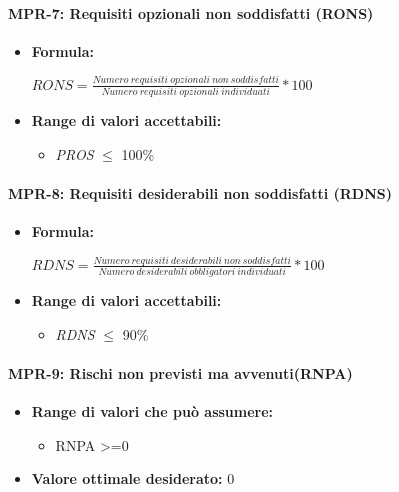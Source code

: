   
\paragraph{MPR-7: Requisiti opzionali non soddisfatti (RONS)}
  \begin{itemize}

    \item \textbf{Formula:}
    \begin{center}
        \(RONS=\frac{Numero\ requisiti\ opzionali\ non\ soddisfatti}{Numero\ requisiti\  opzionali\ individuati}*100\)
    \end{center}
    \item \textbf{Range di valori accettabili:}
    \begin{itemize}
        \item \textit{PROS} $\leq$ 100\%
    
    \end{itemize}
\end{itemize}


\paragraph{MPR-8: Requisiti desiderabili non soddisfatti (RDNS)}
\begin{itemize}
 
  \item \textbf{Formula:}
  \begin{center}
    \(RDNS=\frac{Numero\ requisiti\ desiderabili\ non\ soddisfatti}{Numero\ desiderabili\  obbligatori\ individuati}*100\)
  \end{center}
  \item \textbf{Range di valori accettabili:}
  \begin{itemize}
      \item \textit{RDNS} $\leq$ 90\%
  
  \end{itemize}
\end{itemize}




\paragraph{MPR-9: Rischi non previsti ma avvenuti(RNPA)}
\begin{itemize}

    \item \textbf{Range di valori che può assumere:}
    \begin{itemize}
        \item  RNPA >=0
    \end{itemize}
    \item \textbf{Valore ottimale desiderato:} 0
    

    
\end{itemize}












